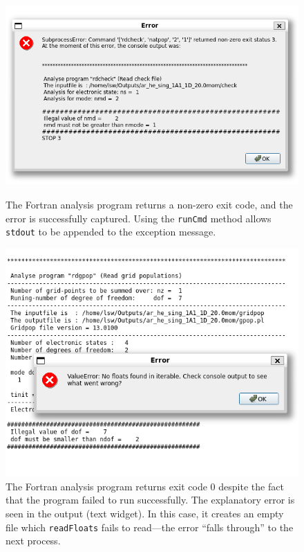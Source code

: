 \documentclass[12pt]{article}
\begin{document}
\begin{figure}[h]
    \centering
    \begin{minipage}[t]{.47\textwidth}
        \centering
        \includegraphics[width=\textwidth]{img/subprocess_error.png}
        \caption{The Fortran analysis program returns a non-zero exit code, and the error is successfully captured. Using the \texttt{runCmd} method allows \texttt{stdout} to be appended to the exception message.}
        \label{fig:subprocess_error}
    \end{minipage}\hfill\begin{minipage}[t]{.47\textwidth}
        \centering
        \includegraphics[width=\textwidth]{img/subprocess_wrong_error.png}
        \caption{The Fortran analysis program returns exit code 0 despite the fact that the program failed to run successfully. The explanatory error is seen in the output (text widget). In this case, it creates an empty file which \texttt{readFloats} fails to read---the error ``falls through'' to the next process.}
        \label{fig:subprocess_wrong_error}
    \end{minipage}
\end{figure}
\end{document}
